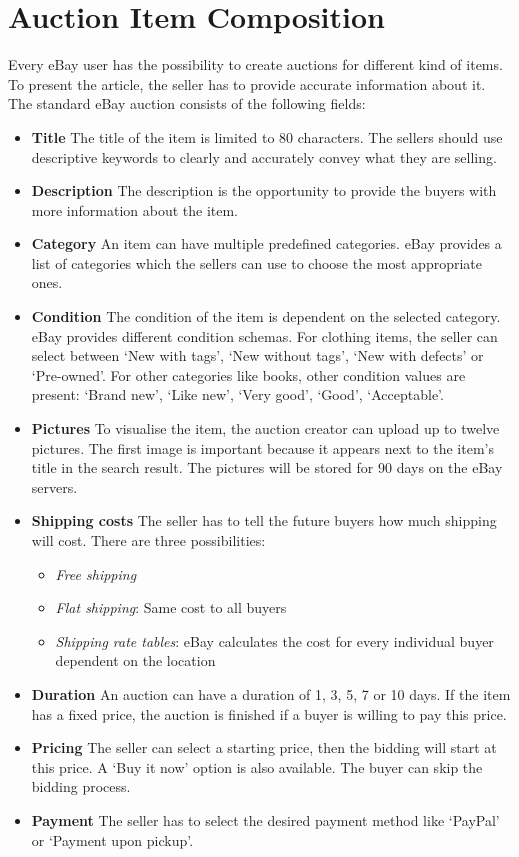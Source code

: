 \section{Auction Item Composition}
Every eBay user has the possibility to create auctions for different kind of items. To present the article, the seller has to provide accurate information about it. The standard eBay auction consists of the following fields:
\begin{itemize}
	\item \textbf{Title} The title of the item is limited to 80 characters. The sellers should use descriptive keywords to clearly and accurately convey what they are selling.
	\item \textbf{Description} The description is the opportunity to provide the buyers with more information about the item.
	\item \textbf{Category} An item can have multiple predefined categories. eBay provides a list of categories which the sellers can use to choose the most appropriate ones.
	\item \textbf{Condition} The condition of the item is dependent on the selected category. eBay provides different condition schemas. For clothing items, the seller can select between `New with tags', `New without tags', `New with defects' or `Pre-owned'. For other categories like books, other condition values are present: `Brand new', `Like new', `Very good', `Good', `Acceptable'.
	\item \textbf{Pictures} To visualise the item, the auction creator can upload up to twelve pictures. The first image is important because it appears next to the item's title in the search result. The pictures will be stored for 90 days on the eBay servers.
	\item \textbf{Shipping costs} The seller has to tell the future buyers how much shipping will cost. There are three possibilities:
	\begin{itemize}
		\item \textit{Free shipping}
		\item \textit{Flat shipping}: Same cost to all buyers
		\item \textit{Shipping rate tables}: eBay calculates the cost for every individual buyer dependent on the location
	\end{itemize}
	\item \textbf{Duration} An auction can have a duration of 1, 3, 5, 7 or 10 days. If the item has a fixed price, the auction is finished if a buyer is willing to pay this price.
	\item \textbf{Pricing} The seller can select a starting price, then the bidding will start at this price. A `Buy it now' option is also available. The buyer can skip the bidding process.
	\item \textbf{Payment} The seller has to select the desired payment method like `PayPal' or `Payment upon pickup'.
\end{itemize}

